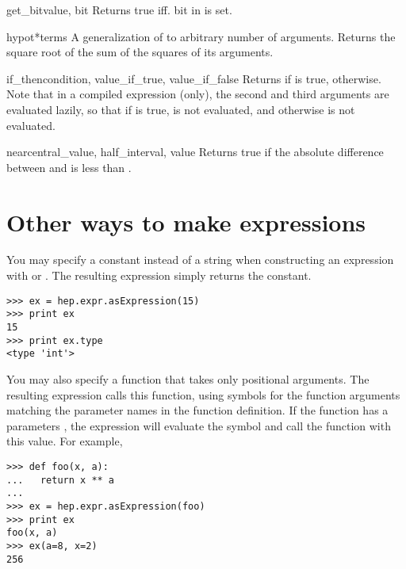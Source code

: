 \begin{funcdesc}{get_bit}{value, bit}
Returns true iff. bit  in  is set.
\end{funcdesc}

\begin{funcdesc}{hypot}{*terms}
A generalization of  to arbitrary number of
arguments.  Returns the square root of the sum of the squares of its
arguments.
\end{funcdesc}

\begin{funcdesc}{if_then}{condition, value_if_true, value_if_false}
Returns  if  is true,
 otherwise.  Note that in a compiled expression
(only), the second and third arguments are evaluated lazily, so that
if  is true,  is not evaluated, and
otherwise  is not evaluated.
\end{funcdesc}

\begin{funcdesc}{near}{central_value, half_interval, value}
Returns true if the absolute difference between  and
 is less than . 
\end{funcdesc}


\section{Other ways to make expressions}

You may specify a constant instead of a string when constructing an
expression with  or .  The
resulting expression simply returns the constant.
\begin{verbatim}
>>> ex = hep.expr.asExpression(15)
>>> print ex
15
>>> print ex.type
<type 'int'>
\end{verbatim}

You may also specify a function that takes only positional arguments.
The resulting expression calls this function, using symbols for the
function arguments matching the parameter names in the function
definition.  If the function has a parameters , the expression
will evaluate the symbol  and call the function with this
value.  For example,
\begin{verbatim}
>>> def foo(x, a):
...   return x ** a
...
>>> ex = hep.expr.asExpression(foo)
>>> print ex
foo(x, a)
>>> ex(a=8, x=2)
256
\end{verbatim}

